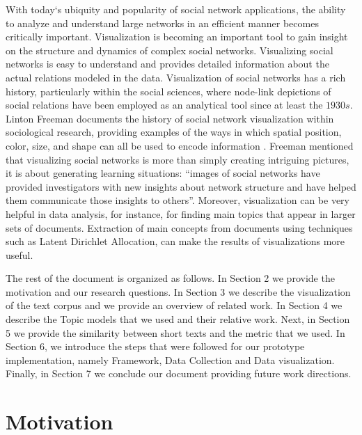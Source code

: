 With today‘s ubiquity and popularity of social network applications, the ability to analyze and understand large networks in an efficient manner becomes
critically important. Visualization is becoming an important tool to gain insight on the structure and dynamics of complex social networks. Visualizing social networks is easy to understand and provides detailed information
about the actual relations modeled in the data. Visualization of social networks has a rich history, particularly within the social sciences, where node-link depictions of social relations have been employed as an analytical tool since at least the $1930s$. Linton Freeman documents the history of social network visualization within sociological research, providing examples of the ways in which spatial position, color, size, and shape can all be used to encode information \cite{freeman}. Freeman mentioned that visualizing social networks
is more than simply creating intriguing pictures, it is about generating
learning situations: “images of social networks have provided investigators with new insights about network structure and have helped them communicate those
insights to others”. Moreover, visualization can be very helpful in data analysis, for instance, for finding main topics that appear in larger sets of documents. Extraction of main concepts from documents using techniques such as Latent Dirichlet Allocation, can make the results of visualizations more useful.

The rest of the document is organized as follows. In Section 2 we provide the motivation and our research questions. In Section 3 we describe the visualization of the text corpus and we provide an overview of related work. In Section 4 we describe the Topic models that we used and their relative work. Next, in Section 5 we provide the similarity between short texts and the metric that we used. In Section 6, we introduce the steps that were followed for our prototype implementation, namely Framework, Data Collection and Data visualization. Finally, in Section 7 we conclude our document providing future work directions.



\section{Motivation}



